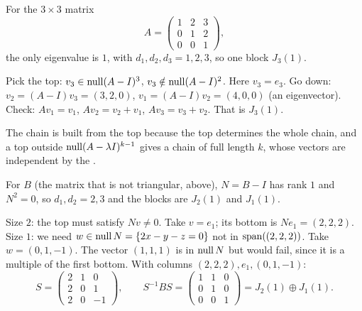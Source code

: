 \documentclass[10pt]{scrartcl}
\begin{document}
\begin{example*}
  For the $3\times 3$ matrix
  \[
    A=\begin{pmatrix}1&2&3\\0&1&2\\0&0&1\end{pmatrix},
  \]
  the only eigenvalue is $1$, with $d_1,d_2,d_3=1,2,3$, so one block $J_3(1)$.
  \begin{steps}
    \ii Pick the top: $v_3\in\operatorname{null}(A-I)^3$, $v_3\notin\operatorname{null}(A-I)^2$. Here $v_3=e_3$.
    \ii Go down: $v_2=(A-I)v_3=(3,2,0)$, $v_1=(A-I)v_2=(4,0,0)$ (an eigenvector).
    \ii Check: $Av_1=v_1$, $Av_2=v_2+v_1$, $Av_3=v_3+v_2$. That is $J_3(1)$.
  \end{steps}
  The chain is built from the top because the top determines the whole chain, and a top outside $\operatorname{null}(A-\lambda I)^{k-1}$ gives a chain of full length $k$, whose vectors are independent by the .

\end{example*}

\begin{example*}
  For $B$ (the matrix that is not triangular, above), $N=B-I$ has rank $1$ and $N^2=0$, so $d_1,d_2=2,3$ and the blocks are $J_2(1)$ and $J_1(1)$.
  \begin{steps}
    \ii Size $2$: the top must satisfy $Nv\ne0$. Take $v=e_1$; its bottom is $Ne_1=(2,2,2)$.
    \ii Size $1$: we need $w\in\operatorname{null} N=\{2x-y-z=0\}$ not in $\operatorname{span}((2,2,2))$. Take $w=(0,1,-1)$. The vector $(1,1,1)$ is in $\operatorname{null} N$ but would fail, since it is a multiple of the first bottom.
    \ii With columns $(2,2,2),e_1,(0,1,-1)$:
    \[ S=\begin{pmatrix}2&1&0\\2&0&1\\2&0&-1\end{pmatrix},\qquad S^{-1}BS=\begin{pmatrix}1&1&0\\0&1&0\\0&0&1\end{pmatrix}=J_2(1)\oplus J_1(1). \]
  \end{steps}
\end{example*}
\end{document}

